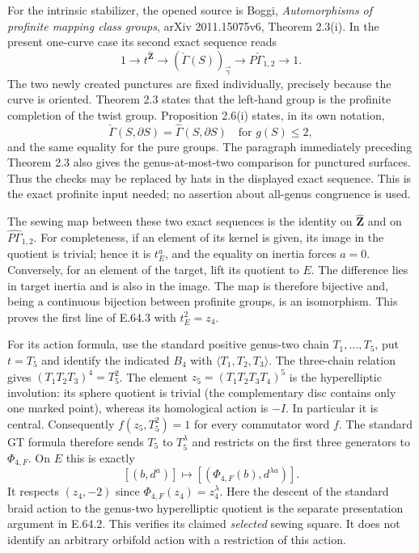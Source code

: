 For the intrinsic stabilizer, the opened source is Boggi,
\emph{Automorphisms of profinite mapping class groups}, arXiv
2011.15075v6, Theorem 2.3(i). In the present one-curve case its second
exact sequence reads
\[
 1\longrightarrow t^{\widehat{\mathbf Z}}
 \longrightarrow(\check\Gamma(S))_{\vec\gamma}
 \longrightarrow P\check\Gamma_{1,2}\longrightarrow1.
\]
The two newly created punctures are fixed individually, precisely
because the curve is oriented. Theorem 2.3 states that the left-hand
group is the profinite completion of the twist group. Proposition
2.6(i) states, in its own notation,
\[
 \check\Gamma(S,\partial S)=\widehat\Gamma(S,\partial S)
       \quad\text{for }g(S)\leq2,
\]
and the same equality for the pure groups. The paragraph immediately
preceding Theorem 2.3 also gives the genus-at-most-two comparison for
punctured surfaces. Thus the checks may be replaced by hats in the
displayed exact sequence. This is the exact profinite input needed;
no assertion about all-genus congruence is used.

The sewing map between these two exact sequences is the identity on
$\widehat{\mathbf Z}$ and on $\widehat{P\Gamma}_{1,2}$.
For completeness, if an element of its kernel is given, its image in
the quotient is trivial; hence it is $t_E^a$, and the equality on
inertia forces $a=0$. Conversely, for an element of the target, lift
its quotient to $E$. The difference lies in target inertia and is
also in the image. The map is therefore bijective and, being a
continuous bijection between profinite groups, is an isomorphism.
This proves the first line of E.64.3 with $t_E^2=z_4$.

For its action formula, use the standard positive genus-two chain
$T_1,\ldots,T_5$, put $t=T_5$ and identify the indicated $B_4$ with
$\langle T_1,T_2,T_3\rangle$. The three-chain relation gives
$(T_1T_2T_3)^4=T_5^2$. The element
$z_5=(T_1T_2T_3T_4)^5$ is the hyperelliptic involution: its sphere
quotient is trivial (the complementary disc contains only one marked
point), whereas its homological action is $-I$. In particular it is
central. Consequently $f(z_5,T_5^2)=1$ for every commutator word $f$.
The standard GT formula therefore sends $T_5$ to $T_5^\lambda$ and
restricts on the first three generators to $\Phi_{4,F}$.
On $E$ this is exactly
\[
 [(b,d^a)]\longmapsto[(\Phi_{4,F}(b),d^{\lambda a})].
\]
It respects $(z_4,-2)$ since $\Phi_{4,F}(z_4)=z_4^\lambda$.
Here the descent of the standard braid action to the genus-two
hyperelliptic quotient is the separate presentation argument in
E.64.2. This verifies its claimed \emph{selected} sewing square.
It does not identify an arbitrary orbifold action with a restriction
of this action.

